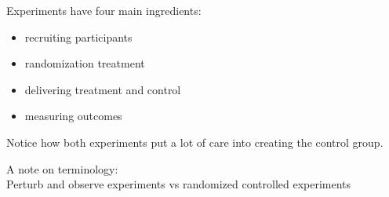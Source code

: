 \documentclass[aspectratio=169]{beamer}
\begin{document}
\begin{frame}

\begin{center}
\end{center}

\end{frame}
\begin{frame}

Experiments have four main ingredients:
\begin{itemize}
\item recruiting participants \pause
\item randomization treatment \pause
\item delivering treatment and control \pause
\item measuring outcomes 
\end{itemize}

\end{frame}
\begin{frame}

Notice how both experiments put a lot of care into creating the control group.

\end{frame}
\begin{frame}

A note on terminology:\\
Perturb and observe experiments vs randomized controlled experiments

\end{frame}
\end{document}
